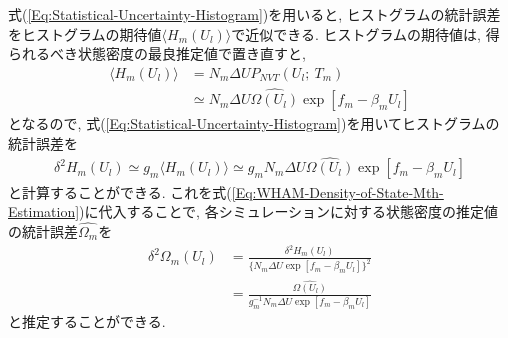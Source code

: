 式(\ref{Eq:Statistical-Uncertainty-Histogram})を用いると, ヒストグラムの統計誤差をヒストグラムの期待値$\langle H_{m}(U_{l})\rangle$で近似できる. ヒストグラムの期待値は, 得られるべき状態密度の最良推定値で置き直すと, 
\begin{align}
    \langle H_{m}(U_{l}) \rangle &=
    N_{m} \Delta U P_{NVT}(U_{l};~T_{m}) \\ &\simeq
    N_{m} \Delta U \hat{\Omega(U_{l})} \exp[f_{m}-\beta_{m}U_{l}]
\end{align}
となるので, 式(\ref{Eq:Statistical-Uncertainty-Histogram})を用いてヒストグラムの統計誤差を
\begin{align}
    \delta^{2} H_{m}(U_{l}) \simeq
    g_{m} \langle H_{m}(U_{l})\rangle \simeq
    g_{m} N_{m} \Delta U \hat{\Omega(U_{l})} \exp[f_{m}-\beta_{m}U_{l}]
\end{align}
と計算することができる. 
これを式(\ref{Eq:WHAM-Density-of-State-Mth-Estimation})に代入することで, 各シミュレーションに対する状態密度の推定値の統計誤差$\hat{\Omega_{m}}$を
\begin{align}
    \delta^{2} \Omega_{m} (U_{l}) &=
    \frac{\delta^{2} H_{m} (U_{l})}{\{N_{m} \Delta U \exp[f_{m} -\beta_{m}U_{l}]\}^{2}}
    \\ &=
    \frac{\hat{\Omega(U_{l})}}{g_{m}^{-1}N_{m} \Delta U \exp[f_{m} -\beta_{m}U_{l}]}
    \label{Eq:WHAM-Density-of-States-Mth-Estimation}
\end{align}
と推定することができる. 


